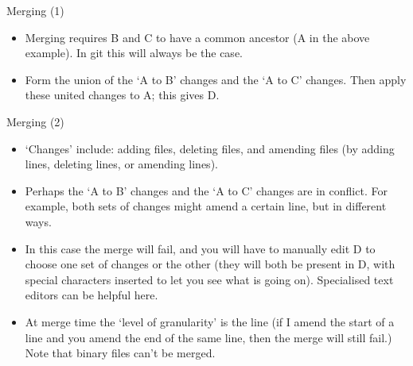 \documentclass[usenames,dvipsnames]{beamer}
\begin{document}
\begin{frame}{Merging (1)}
  \begin{figure}
    \begin{center}
    \end{center}
  \end{figure}
  \begin{block}{}
    \begin{itemize}
      \item{Merging requires B and C to have a common ancestor (A in the above example). In git this will always be the case.}
      \item{Form the union of the `A to B' changes and the `A to C' changes. Then apply these united changes to A; this gives D.}
    \end{itemize}
  \end{block}
\end{frame}

\begin{frame}{Merging (2)}
  \begin{block}{}
    \begin{itemize}
      \item{`Changes' include: adding files, deleting files, and amending files (by adding lines, deleting lines, or amending lines).}
      \item{Perhaps the `A to B' changes and the `A to C' changes are in conflict. For example, both sets of changes might amend a certain line, but in different ways.}
      \item{In this case the merge will fail, and you will have to manually edit D to choose one set of changes or the other (they will both be present in D, with special characters inserted to let you see what is going on). Specialised text editors can be helpful here.}
      \item{At merge time the `level of granularity' is the line (if I amend the start of a line and you amend the end of the same line, then the merge will still fail.) Note that binary files can't be merged.}
    \end{itemize}
  \end{block}
\end{frame}
\end{document}
